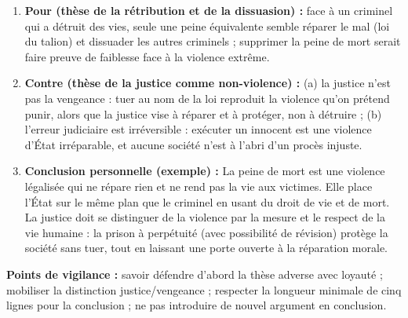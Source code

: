 \documentclass[11pt]{article}
\newcommand{\cle}[1]{{\popxbold\color{popdark}#1}}
\begin{document}
\begin{corrige}
\begin{enumerate}
\item \textbf{Pour (thèse de la rétribution et de la dissuasion) :} face à un criminel qui a détruit des vies, seule une peine équivalente semble réparer le mal (loi du talion) et dissuader les autres criminels ; supprimer la peine de mort serait faire preuve de faiblesse face à la violence extrême.
\item \textbf{Contre (thèse de la justice comme non-violence) :} (a) la \cle{justice} n'est pas la \cle{vengeance} : tuer au nom de la loi reproduit la violence qu'on prétend punir, alors que la justice vise à réparer et à protéger, non à détruire ; (b) l'\cle{erreur judiciaire} est irréversible : exécuter un innocent est une violence d'État irréparable, et aucune société n'est à l'abri d'un procès injuste.
\item \textbf{Conclusion personnelle (exemple) :} La peine de mort est une violence légalisée qui ne répare rien et ne rend pas la vie aux victimes. Elle place l'État sur le même plan que le criminel en usant du droit de vie et de mort. La justice doit se distinguer de la violence par la mesure et le respect de la vie humaine : la prison à perpétuité (avec possibilité de révision) protège la société sans tuer, tout en laissant une porte ouverte à la réparation morale.
\end{enumerate}
\textbf{Points de vigilance :} savoir défendre d'abord la thèse adverse avec loyauté ; mobiliser la distinction \cle{justice}/\cle{vengeance} ; respecter la longueur minimale de cinq lignes pour la conclusion ; ne pas introduire de nouvel argument en conclusion.
\end{corrige}
\end{document}
